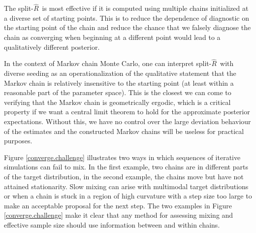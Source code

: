 \documentclass[american,]{article}
\newcommand{\sRhat}{split-$\widehat{R}$}
\begin{document}
The \sRhat\ is most effective if it is computed using multiple chains initialized at a 
diverse set of starting points. This is to reduce the dependence of diagnostic
on the starting point of the chain and reduce the chance that we falsely diagnose
the chain as converging when beginning at a different point would lead to a 
qualitatively different posterior.

In the context of Markov chain Monte Carlo, one can interpret \sRhat\ 
with diverse seeding as an operationalization of the qualitative statement 
that the Markov chain is relatively insensitive to the starting point (at least within a 
reasonable part of the parameter space). This is the closest we can come to 
verifying that the Markov chain is geometrically ergodic, which is a critical 
property if we want  a central limit theorem to hold for the approximate
posterior expectations. Without this, we have no control over the large
deviation behaviour of the estimates and the constructed Markov chains will
be useless for practical purposes.

 Figure
\ref{converge.challenge} illustrates two ways in which sequences of
iterative simulations can fail to mix. In the first example, two chains
are in different parts of the target distribution, in the second
example, the chains move but have not attained stationarity. Slow mixing can arise with multimodal target distributions or when a chain is
stuck in a region of high curvature with a step size too large to make an
acceptable proposal for the next step. The two examples in Figure \ref{converge.challenge}  make it clear that 
any method for assessing mixing and effective sample size should use information
between and within chains.
\end{document}
